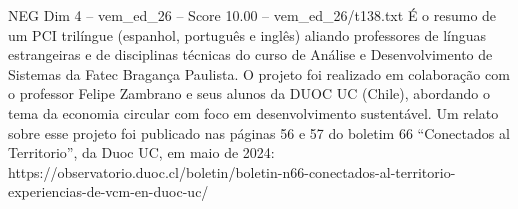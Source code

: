 \begin{textsample}{NEG Dim 4 – vem\_ed\_26 – Score 10.00 – vem\_ed\_26/t138.txt}
É o resumo de um PCI trilíngue (espanhol, português e inglês) aliando professores de línguas estrangeiras e de disciplinas técnicas do curso de Análise e Desenvolvimento de Sistemas da Fatec Bragança Paulista.
O projeto foi realizado em colaboração com o professor Felipe Zambrano e seus alunos da DUOC UC (Chile), abordando o tema da economia circular com foco em desenvolvimento sustentável.
Um relato sobre esse projeto foi publicado nas páginas 56 e 57 do boletim 66 “Conectados al Territorio”, da Duoc UC, em maio de 2024: https://observatorio.duoc.cl/boletin/boletin-n66-conectados-al-territorio-experiencias-de-vcm-en-duoc-uc/

\end{textsample}
